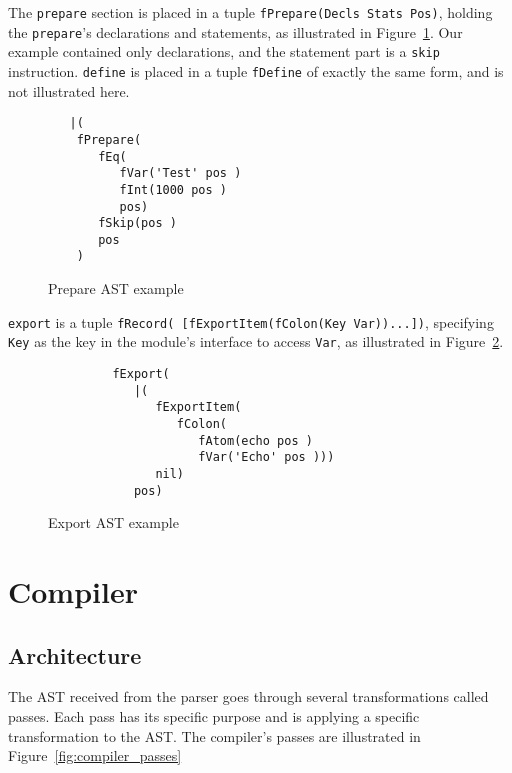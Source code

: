 \documentclass[a4paper]{memoir}
\begin{document}
The \lstinline!prepare! section is placed in a tuple 
\lstinline!fPrepare(Decls Stats Pos)!, holding the \lstinline!prepare!'s
declarations and statements, as illustrated in
Figure~\ref{fig:functor_example_prepare}.
Our example contained only declarations, and the statement part is a \lstinline!skip! instruction.
\lstinline!define! is placed in a tuple \lstinline!fDefine! of exactly the same form, and is not illustrated here.

\begin{figure}[ht]
\begin{lstlisting}
   |(
    fPrepare(
       fEq(
          fVar('Test' pos )
          fInt(1000 pos )
          pos)
       fSkip(pos )
       pos
    )

\end{lstlisting}
\caption{Prepare AST example}
\label{fig:functor_example_prepare}
\end{figure}

\lstinline!export! is a tuple 
\lstinline!fRecord( [fExportItem(fColon(Key Var))...])!, specifying
\lstinline!Key! as the key in the module's interface to access
\lstinline!Var!, as illustrated in Figure~\ref{fig:functor_example_export}.

\begin{figure}[h]
\begin{lstlisting}
         fExport(
            |(
               fExportItem(
                  fColon(
                     fAtom(echo pos )
                     fVar('Echo' pos )))
               nil)
            pos)
\end{lstlisting}
\caption{Export AST example}
\label{fig:functor_example_export}
\end{figure}





\chapter{Compiler}
\section{Architecture}
The AST received from the parser goes through several transformations called
passes. Each pass has its specific purpose and is applying a specific
transformation to the AST. The compiler's passes are illustrated in Figure~\ref{fig:compiler_passes}
\end{document}
